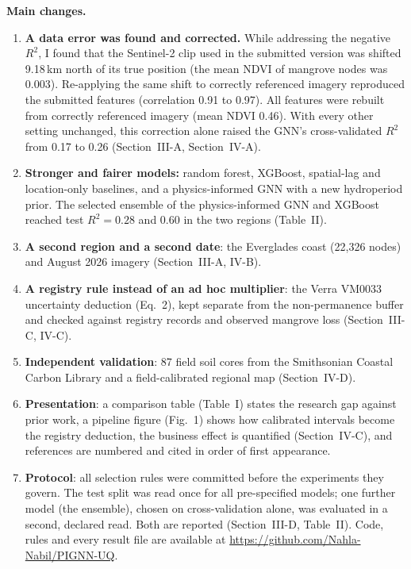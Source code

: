 \documentclass[10pt]{article}
\begin{document}
\textbf{Main changes.}
\begin{enumerate}\setlength{\itemsep}{1pt}
\item \textbf{A data error was found and corrected.} While addressing the negative $R^2$, I found that the Sentinel-2 clip used in the submitted version was shifted 9.18\,km north of its true position (the mean NDVI of mangrove nodes was 0.003). Re-applying the same shift to correctly referenced imagery reproduced the submitted features (correlation 0.91 to 0.97). All features were rebuilt from correctly referenced imagery (mean NDVI 0.46). With every other setting unchanged, this correction alone raised the GNN's cross-validated $R^2$ from 0.17 to 0.26 (Section~III-A, Section~IV-A).
\item \textbf{Stronger and fairer models:} random forest, XGBoost, spatial-lag and location-only baselines, and a physics-informed GNN with a new hydroperiod prior. The selected ensemble of the physics-informed GNN and XGBoost reached test $R^2=0.28$ and 0.60 in the two regions (Table~II).
\item \textbf{A second region and a second date}: the Everglades coast (22,326 nodes) and August 2026 imagery (Section~III-A, IV-B).
\item \textbf{A registry rule instead of an ad hoc multiplier}: the Verra VM0033 uncertainty deduction (Eq.~2), kept separate from the non-permanence buffer and checked against registry records and observed mangrove loss (Section~III-C, IV-C).
\item \textbf{Independent validation}: 87 field soil cores from the Smithsonian Coastal Carbon Library and a field-calibrated regional map (Section~IV-D).
\item \textbf{Presentation}: a comparison table (Table~I) states the research gap against prior work, a pipeline figure (Fig.~1) shows how calibrated intervals become the registry deduction, the business effect is quantified (Section~IV-C), and references are numbered and cited in order of first appearance.
\item \textbf{Protocol}: all selection rules were committed before the experiments they govern. The test split was read once for all pre-specified models; one further model (the ensemble), chosen on cross-validation alone, was evaluated in a second, declared read. Both are reported (Section~III-D, Table~II). Code, rules and every result file are available at \url{https://github.com/Nahla-Nabil/PIGNN-UQ}.
\end{enumerate}
\end{document}
